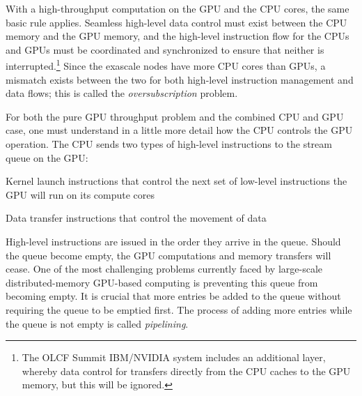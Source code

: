 \documentclass[10pt,journal,compsoc]{IEEEtran}
\newenvironment{titemize} %
        {\begin{list}{\labelitemi}{
                \setlength{\topsep}{0pt}
                \setlength{\parskip}{0pt}
                \setlength{\itemsep}{0pt}
                \setlength{\parsep}{0pt}
                \setlength{\leftmargin}{23pt}
                \setlength{\labelwidth}{23pt}
        }}
        {\end{list}}
\begin{document}
With a high-throughput computation on the GPU and the CPU  cores, the same basic rule applies.  Seamless high-level
data control must exist between the CPU memory and the GPU memory, and the high-level instruction flow for the CPUs and GPUs must be coordinated and synchronized to ensure that neither is
interrupted.\footnote{The OLCF Summit IBM/NVIDIA system includes an additional layer, whereby data control for transfers directly from the CPU caches to the GPU memory, but this will be
ignored.} Since the exascale nodes have more CPU cores than GPUs,  a mismatch exists between the two for both high-level instruction management and data flows; this
is called the \emph{oversubscription} problem.

For both the pure GPU throughput problem and the combined CPU and GPU case, one must understand in a little more detail  how the CPU controls the GPU operation. %
The CPU sends two types of high-level instructions to the stream queue on the GPU:
\begin{titemize}
 \item Kernel launch instructions that control the next set of low-level instructions the GPU will run on its compute cores
 \item Data transfer instructions that control the movement of data
\end{titemize}
High-level instructions are issued in the order they arrive in the queue.
Should the queue become empty, the GPU computations and memory transfers will cease. One of the most challenging problems currently faced by large-scale distributed-memory GPU-based computing is preventing this queue from
becoming empty. It is crucial that more entries be added to the queue without requiring the queue to be emptied first. The process of adding more entries while the queue
is not empty is called \emph{pipelining}.  
\end{document}
